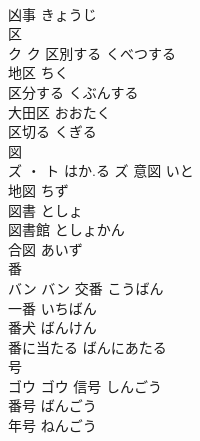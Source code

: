 \documentclass[8pt]{extreport}
\begin{document}
\begin{CJK}{UTF8}{min}
\\	凶事	きょうじ	
\\	区	
\\	ク		ク	区別する	くべつする	
\\	地区	ちく	
\\	区分する	くぶんする	
\\	大田区	おおたく	
\\	区切る	くぎる	
\\	図	
\\	ズ ・ ト	はか.る	ズ	意図	いと	
\\	地図	ちず	
\\	図書	としょ	
\\	図書館	としょかん	
\\	合図	あいず	
\\	番	
\\	バン		バン	交番	こうばん	
\\	一番	いちばん	
\\	番犬	ばんけん	
\\	番に当たる	ばんにあたる	
\\	号	
\\	ゴウ		ゴウ	信号	しんごう	
\\	番号	ばんごう	
\\	年号	ねんごう	
\end{CJK}
\end{document}

